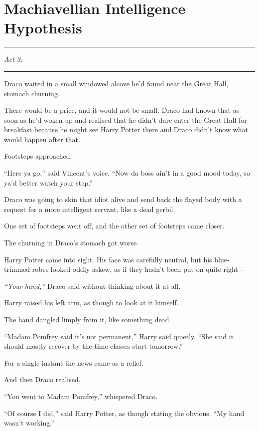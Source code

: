 \chapter{Machiavellian Intelligence Hypothesis}

\begin{center}\rule{3in}{0.4pt}\end{center}

\emph{Act 3:}

\begin{center}\rule{3in}{0.4pt}\end{center}

Draco waited in a small windowed alcove he'd found near the Great Hall,
stomach churning.

There would be a price, and it would not be small. Draco had known that
as soon as he'd woken up and realised that he didn't dare enter the
Great Hall for breakfast because he might see Harry Potter there and
Draco didn't know what would happen after that.

Footsteps approached.

``Here ya go,'' said Vincent's voice. ``Now da boss ain't in a good mood
today, so ya'd better watch your step.''

Draco was going to skin that idiot alive and send back the flayed body
with a request for a more intelligent servant, like a dead gerbil.

One set of footsteps went off, and the other set of footsteps came
closer.

The churning in Draco's stomach got worse.

Harry Potter came into sight. His face was carefully neutral, but his
blue-trimmed robes looked oddly askew, as if they hadn't been put on
quite right---

\emph{``Your hand,''} Draco said without thinking about it at all.

Harry raised his left arm, as though to look at it himself.

The hand dangled limply from it, like something dead.

``Madam Pomfrey said it's not permanent,'' Harry said quietly. ``She
said it should mostly recover by the time classes start tomorrow.''

For a single instant the news came as a relief.

And then Draco realised.

``You went to Madam Pomfrey,'' whispered Draco.

``Of course I did,'' said Harry Potter, as though stating the obvious.
``My hand wasn't working.''

